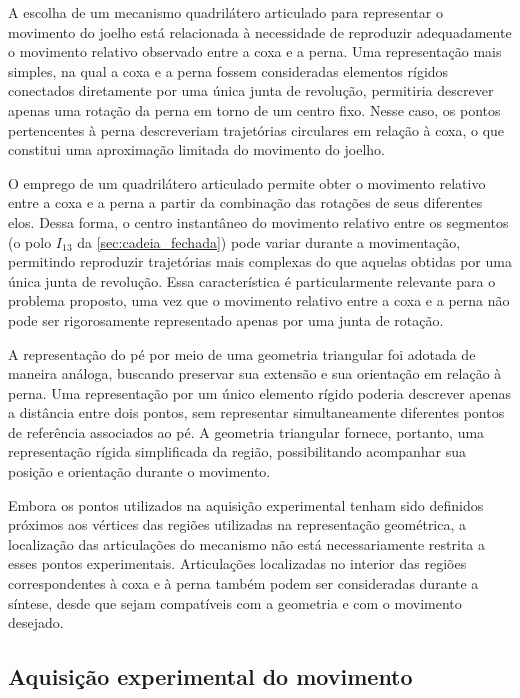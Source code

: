 \documentclass[12pt,a4paper,twoside]{article}
\numberwithin{equation}{section}
\begin{document}
A escolha de um mecanismo quadrilátero articulado para representar o movimento do
joelho está relacionada à necessidade de reproduzir adequadamente o movimento relativo
observado entre a coxa e a perna. Uma representação mais simples, na qual a coxa e a
perna fossem consideradas elementos rígidos conectados diretamente por uma única junta
de revolução, permitiria descrever apenas uma rotação da perna em torno de um centro
fixo. Nesse caso, os pontos pertencentes à perna descreveriam trajetórias circulares em
relação à coxa, o que constitui uma aproximação limitada do movimento do joelho.

O emprego de um quadrilátero articulado permite obter o movimento relativo entre a
coxa e a perna a partir da combinação das rotações de seus diferentes elos. Dessa
forma, o centro instantâneo do movimento relativo entre os segmentos (o polo $I_{13}$ da
\cref{sec:cadeia_fechada}) pode variar durante a movimentação, permitindo reproduzir
trajetórias mais complexas do que aquelas obtidas por uma única junta de revolução.
Essa característica é particularmente relevante para o problema proposto, uma vez que
o movimento relativo entre a coxa e a perna não pode ser rigorosamente representado
apenas por uma junta de rotação.

A representação do pé por meio de uma geometria triangular foi adotada de maneira
análoga, buscando preservar sua extensão e sua orientação em relação à perna. Uma
representação por um único elemento rígido poderia descrever apenas a distância entre
dois pontos, sem representar simultaneamente diferentes pontos de referência
associados ao pé. A geometria triangular fornece, portanto, uma representação rígida
simplificada da região, possibilitando acompanhar sua posição e orientação durante o
movimento.

Embora os pontos utilizados na aquisição experimental tenham sido definidos próximos
aos vértices das regiões utilizadas na representação geométrica, a localização das
articulações do mecanismo não está necessariamente restrita a esses pontos
experimentais. Articulações localizadas no interior das regiões correspondentes à coxa
e à perna também podem ser consideradas durante a síntese, desde que sejam compatíveis
com a geometria e com o movimento desejado.

\subsection{Aquisição experimental do movimento}\label{sec:aquisicao}
\end{document}
